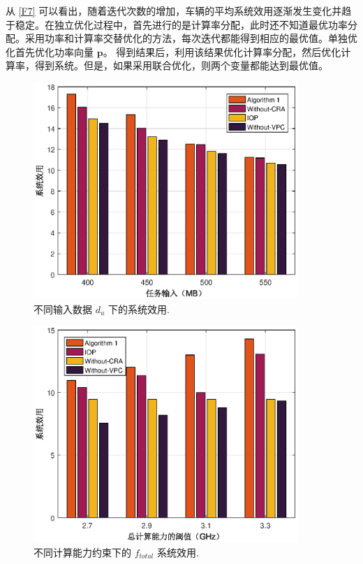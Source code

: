 从 \ref{F7} 可以看出，随着迭代次数的增加，车辆的平均系统效用逐渐发生变化并趋于稳定。在独立优化过程中，首先进行的是计算率分配，此时还不知道最优功率分配。采用功率和计算率交替优化的方法，每次迭代都能得到相应的最优值。单独优化首先优化功率向量 $\mathbf{p}$。 得到结果后，利用该结果优化计算率分配，然后优化计算率，得到系统。但是，如果采用联合优化，则两个变量都能达到最优值。
\begin{figure}[H]
\centering
\includegraphics[width=10cm]{figures//chap3//diff_dup.eps}
\caption{不同输入数据 $d_u$ 下的系统效用.}
\label{F8}
\end{figure}
\begin{figure}[H]
\centering
\includegraphics[width=10cm]{figures//chap3//diff_total.eps}
\caption{不同计算能力约束下的 $f_{total}$ 系统效用.}
\label{F9}
\end{figure}

